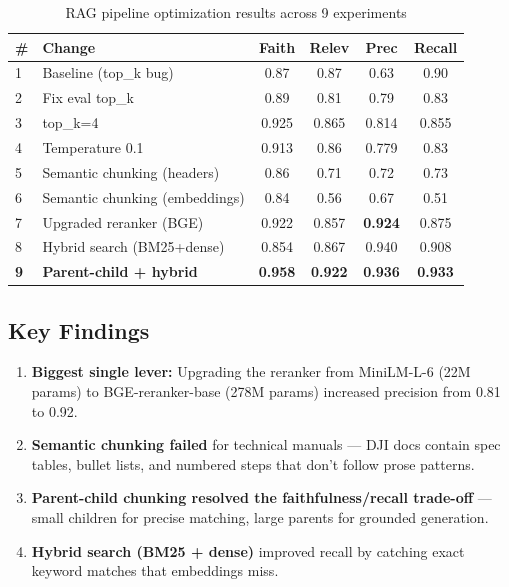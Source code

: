 \documentclass[12pt,a4paper]{article}
\begin{document}
\begin{table}[H]
\centering
\small
\begin{tabular}{llcccc}
\toprule
\textbf{\#} & \textbf{Change} & \textbf{Faith} & \textbf{Relev} & \textbf{Prec} & \textbf{Recall} \\
\midrule
1 & Baseline (top\_k bug) & 0.87 & 0.87 & 0.63 & 0.90 \\
2 & Fix eval top\_k & 0.89 & 0.81 & 0.79 & 0.83 \\
3 & top\_k=4 & 0.925 & 0.865 & 0.814 & 0.855 \\
4 & Temperature 0.1 & 0.913 & 0.86 & 0.779 & 0.83 \\
5 & Semantic chunking (headers) & 0.86 & 0.71 & 0.72 & 0.73 \\
6 & Semantic chunking (embeddings) & 0.84 & 0.56 & 0.67 & 0.51 \\
7 & Upgraded reranker (BGE) & 0.922 & 0.857 & \textbf{0.924} & 0.875 \\
8 & Hybrid search (BM25+dense) & 0.854 & 0.867 & 0.940 & 0.908 \\
\textbf{9} & \textbf{Parent-child + hybrid} & \textbf{0.958} & \textbf{0.922} & \textbf{0.936} & \textbf{0.933} \\
\bottomrule
\end{tabular}
\caption{RAG pipeline optimization results across 9 experiments}
\end{table}

\subsection{Key Findings}

\begin{enumerate}
  \item \textbf{Biggest single lever:} Upgrading the reranker from MiniLM-L-6 (22M params) to BGE-reranker-base (278M params) increased precision from 0.81 to 0.92.
  \item \textbf{Semantic chunking failed} for technical manuals — DJI docs contain spec tables, bullet lists, and numbered steps that don't follow prose patterns.
  \item \textbf{Parent-child chunking resolved the faithfulness/recall trade-off} — small children for precise matching, large parents for grounded generation.
  \item \textbf{Hybrid search (BM25 + dense)} improved recall by catching exact keyword matches that embeddings miss.
\end{enumerate}
\end{document}
